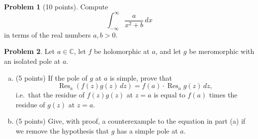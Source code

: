 \documentclass[11pt,oneside]{amsart}
\theoremstyle{definition}
\newtheorem{problem}{Problem}
\newcommand{\bC}{\mathbb{C}}
\DeclareMathOperator{\Res}{Res}
\begin{document}
\newpage

\begin{problem}[10 points]
  Compute
  \[\int_{-\infty}^\infty\frac{a}{x^2+b}\,dx\]
  in terms of the real numbers $a,b>0$.
\end{problem}

\newpage

\begin{problem}
  Let $a\in\bC$, let $f$ be holomorphic at $a$, and let $g$ be meromorphic with an isolated pole at $a$.
  \begin{enumerate}[(a)]
    \item (5 points) If the pole of $g$ at $a$ is simple, prove that
    \[\Res_{a}(f(z)g(z)\,dz)=f(a)\cdot \Res_{a}g(z)\,dz,\]
    i.e.\ that the residue of $f(z)g(z)$ at $z=a$ is equal to $f(a)$ times the residue of $g(z)$ at $z=a$.
    \vfill
    \item (5 points) Give, with proof, a counterexample to the equation in part (a) if we remove the hypothesis that $g$ has a simple pole at $a$.
    \vfill
  \end{enumerate}
\end{problem}
\end{document}
